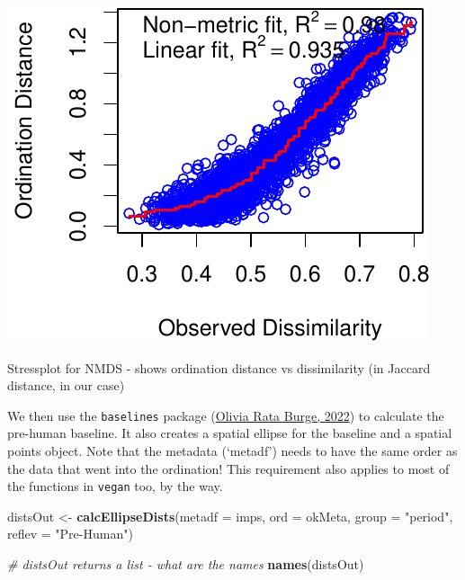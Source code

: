 \documentclass[nofonts,]{tufte-handout}
\newenvironment{Shaded}{\begin{snugshade}}{\end{snugshade}}
\newcommand{\AttributeTok}[1]{\textcolor[rgb]{0.13,0.29,0.53}{#1}}
\newcommand{\CommentTok}[1]{\textcolor[rgb]{0.56,0.35,0.01}{\textit{#1}}}
\newcommand{\FunctionTok}[1]{\textcolor[rgb]{0.13,0.29,0.53}{\textbf{#1}}}
\newcommand{\NormalTok}[1]{#1}
\newcommand{\OtherTok}[1]{\textcolor[rgb]{0.56,0.35,0.01}{#1}}
\newcommand{\StringTok}[1]{\textcolor[rgb]{0.31,0.60,0.02}{#1}}
\begin{document}
\begin{marginfigure}
\includegraphics{Technical-supplement_files/figure-latex/fig-margin-1} \caption[Stressplot for NMDS - shows ordination distance vs dissimilarity (in Jaccard distance, in our case)]{Stressplot for NMDS - shows ordination distance vs dissimilarity (in Jaccard distance, in our case)}\label{fig:fig-margin}
\end{marginfigure}

We then use the \texttt{baselines} package
(\protect\hyperlink{ref-burge_2022_baselines}{Olivia Rata Burge, 2022})
to calculate the pre-human baseline. It also creates a spatial ellipse
for the baseline and a spatial points object. Note that the metadata
(`metadf') needs to have the same order as the data that went into the
ordination! This requirement also applies to most of the functions in
\texttt{vegan} too, by the way.

\begin{Shaded}
\begin{Highlighting}[]
\NormalTok{distsOut }\OtherTok{\textless{}{-}} \FunctionTok{calcEllipseDists}\NormalTok{(}\AttributeTok{metadf =}\NormalTok{ imps, }
                        \AttributeTok{ord =}\NormalTok{ okMeta,}
                        \AttributeTok{group =} \StringTok{"period"}\NormalTok{, }
                        \AttributeTok{reflev =} \StringTok{"Pre{-}Human"}\NormalTok{)}

\CommentTok{\# distsOut returns a list {-} what are the names}
\FunctionTok{names}\NormalTok{(distsOut)}
\end{Highlighting}
\end{Shaded}
\end{document}
